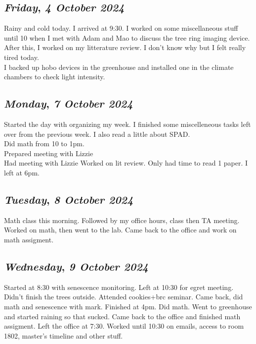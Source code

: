\def\day{\textit{4 October 2024}}
\def\weekday{\textit{Friday}}
\subsection*{\weekday, \day}
Rainy and cold today. I arrived at 9:30. I worked on some miscellaneous stuff until 10 when I met with Adam and Mao to discuss the tree ring imaging device. After this, I worked on my litterature review. I don't know why but I felt really tired today. \\
I backed up hobo devices in the greenhouse and installed one in the climate chambers to check light intensity. 

\def\day{\textit{7 October 2024}}
\def\weekday{\textit{Monday}}
\subsection*{\weekday, \day}
Started the day with organizing my week. I finished some miscelleneous tasks left over from the previous week. I also read a little about SPAD. \\
Did math from 10 to 1pm. \\
Prepared meeting with Lizzie\\
Had meeting with Lizzie
Worked on lit review. Only had time to read 1 paper. I left at 6pm.

\def\day{\textit{8 October 2024}}
\def\weekday{\textit{Tuesday}}
\subsection*{\weekday, \day}
Math class this morning. Followed by my office hours, class then TA meeting.\\ 
Worked on math, then went to the lab. Came back to the office and work on math assigment.

\def\day{\textit{9 October 2024}}
\def\weekday{\textit{Wednesday}}
\subsection*{\weekday, \day}
Started at 8:30 with senescence monitoring. Left at 10:30 for egret meeting. Didn't finish the trees outside. Attended cookies+brc seminar. Came back, did math and senescence with mark. Finished at 4pm. Did math. Went to greenhouse and started raining so that sucked. Came back to the office and finished math assigment. Left the office at 7:30. Worked until 10:30 on emails, access to room 1802, master's timeline and other stuff.

